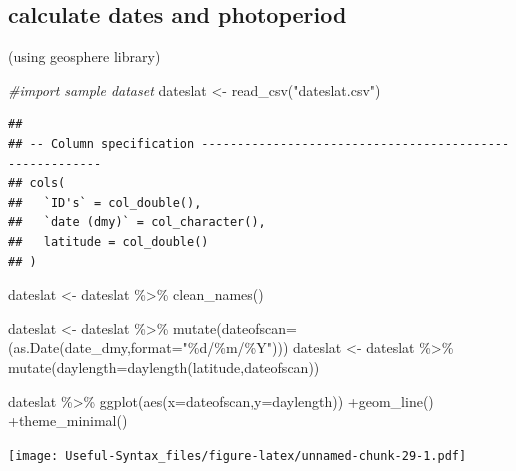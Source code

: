\documentclass[
]{article}
\newenvironment{Shaded}{\begin{snugshade}}{\end{snugshade}}
\newcommand{\AttributeTok}[1]{\textcolor[rgb]{0.77,0.63,0.00}{#1}}
\newcommand{\CommentTok}[1]{\textcolor[rgb]{0.56,0.35,0.01}{\textit{#1}}}
\newcommand{\FunctionTok}[1]{\textcolor[rgb]{0.00,0.00,0.00}{#1}}
\newcommand{\NormalTok}[1]{#1}
\newcommand{\OtherTok}[1]{\textcolor[rgb]{0.56,0.35,0.01}{#1}}
\newcommand{\SpecialCharTok}[1]{\textcolor[rgb]{0.00,0.00,0.00}{#1}}
\newcommand{\StringTok}[1]{\textcolor[rgb]{0.31,0.60,0.02}{#1}}
\begin{document}
\hypertarget{calculate-dates-and-photoperiod}{%
\subsection{calculate dates and photoperiod}\label{calculate-dates-and-photoperiod}}

(using geosphere library)

\begin{Shaded}
\begin{Highlighting}[]
\CommentTok{\#import sample dataset}
\NormalTok{dateslat }\OtherTok{\textless{}{-}} \FunctionTok{read\_csv}\NormalTok{(}\StringTok{"dateslat.csv"}\NormalTok{)}
\end{Highlighting}
\end{Shaded}

\begin{verbatim}
## 
## -- Column specification --------------------------------------------------------
## cols(
##   `ID's` = col_double(),
##   `date (dmy)` = col_character(),
##   latitude = col_double()
## )
\end{verbatim}

\begin{Shaded}
\begin{Highlighting}[]
\NormalTok{dateslat }\OtherTok{\textless{}{-}}\NormalTok{ dateslat }\SpecialCharTok{\%\textgreater{}\%}
  \FunctionTok{clean\_names}\NormalTok{()}

\NormalTok{dateslat }\OtherTok{\textless{}{-}}\NormalTok{ dateslat }\SpecialCharTok{\%\textgreater{}\%} \FunctionTok{mutate}\NormalTok{(}\AttributeTok{dateofscan=}\NormalTok{(}\FunctionTok{as.Date}\NormalTok{(date\_dmy,}\AttributeTok{format=}\StringTok{"\%d/\%m/\%Y"}\NormalTok{)))}
\NormalTok{dateslat }\OtherTok{\textless{}{-}}\NormalTok{ dateslat }\SpecialCharTok{\%\textgreater{}\%} \FunctionTok{mutate}\NormalTok{(}\AttributeTok{daylength=}\FunctionTok{daylength}\NormalTok{(latitude,dateofscan))}
                                
\NormalTok{dateslat }\SpecialCharTok{\%\textgreater{}\%} \FunctionTok{ggplot}\NormalTok{(}\FunctionTok{aes}\NormalTok{(}\AttributeTok{x=}\NormalTok{dateofscan,}\AttributeTok{y=}\NormalTok{daylength)) }\SpecialCharTok{+}\FunctionTok{geom\_line}\NormalTok{() }\SpecialCharTok{+}\FunctionTok{theme\_minimal}\NormalTok{()}
\end{Highlighting}
\end{Shaded}

\texttt{[image: Useful-Syntax\_files/figure-latex/unnamed-chunk-29-1.pdf]}
\end{document}
